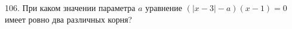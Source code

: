 106. При каком значении параметра $a$ уравнение $(|x-3|-a)(x-1)=0$ имеет ровно два различных корня?\\
